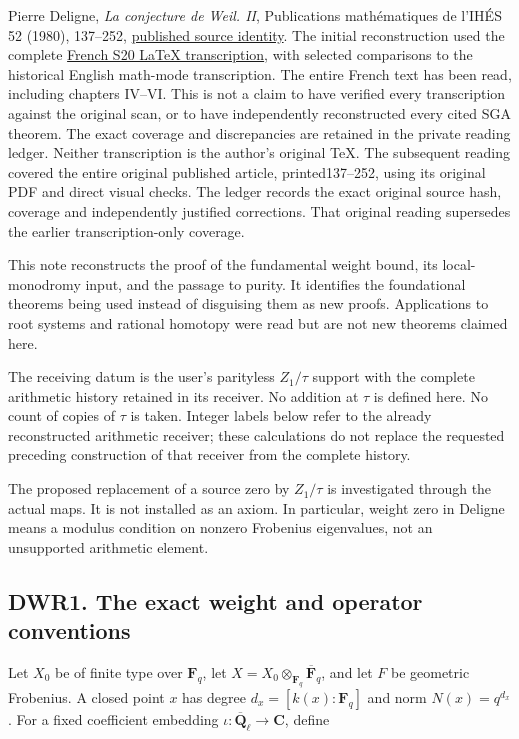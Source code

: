 Pierre Deligne, \emph{La conjecture de Weil. II}, Publications
mathématiques de l'IHÉS 52 (1980), 137--252,
\href{https://numdam.org/item/PMIHES_1980__52__137_0/}{published source
identity}. The initial reconstruction used the complete
\href{https://www.numdam.org/item/PMIHES_1980__52__137_0/}{French
S20 LaTeX transcription}, with selected comparisons to the historical
English math-mode transcription. The entire French text has been read,
including chapters IV--VI. This is not a claim to have verified every
transcription against the original scan, or to have independently
reconstructed every cited SGA theorem. The exact coverage and
discrepancies are retained in
{the private
reading ledger}. Neither transcription is the author's original TeX. The
subsequent reading covered the entire original published article,
printed137--252, using its original PDF and direct visual checks. The
ledger records the exact original source hash, coverage and
independently justified corrections. That original reading supersedes
the earlier transcription-only coverage.

This note reconstructs the proof of the fundamental weight bound, its
local-monodromy input, and the passage to purity. It identifies the
foundational theorems being used instead of disguising them as new
proofs. Applications to root systems and rational homotopy were read but
are not new theorems claimed here.

The receiving datum is the user's parityless \(Z_1/\tau\) support with
the complete arithmetic history retained in its receiver. No addition at
\(\tau\) is defined here. No count of copies of \(\tau\) is taken.
Integer labels below refer to the already reconstructed arithmetic
receiver; these calculations do not replace the requested preceding
construction of that receiver from the complete history.

The proposed replacement of a source zero by \(Z_1/\tau\) is
investigated through the actual maps. It is not installed as an axiom.
In particular, weight zero in Deligne means a modulus condition on
nonzero Frobenius eigenvalues, not an unsupported arithmetic element.

\subsection{DWR1. The exact weight and operator
conventions}\label{dwr1.-the-exact-weight-and-operator-conventions}

Let \(X_0\) be of finite type over \(\mathbf F_q\), let
\(X=X_0\otimes_{\mathbf F_q}\overline{\mathbf F}_q\), and let \(F\) be
geometric Frobenius. A closed point \(x\) has degree
\(d_x=[k(x):\mathbf F_q]\) and norm \(N(x)=q^{d_x}\). For a fixed
coefficient embedding \(\iota:\overline{\mathbf Q}_\ell\to\mathbf C\),
define

